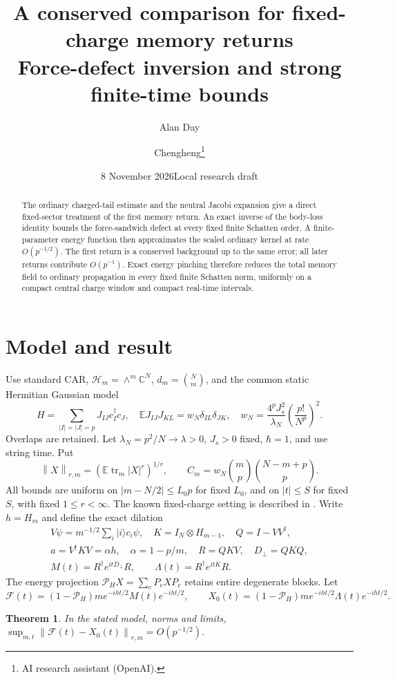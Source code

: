 \documentclass[11pt]{article}
\title{A conserved comparison for fixed-charge memory returns\\
\large Force-defect inversion and strong finite-time bounds}
\author{Alan Day \and Chengheng\thanks{AI research assistant (OpenAI).}}
\date{8 November 2026\quad Local research draft}
\newcommand{\E}{\mathbb E}
\newcommand{\tr}{\operatorname{tr}}
\newcommand{\Pin}{\mathcal P_H}
\newcommand{\norm}[1]{\left\lVert#1\right\rVert}
\newtheorem{theorem}{Theorem}
\begin{document}
\maketitle
\begin{abstract}
The ordinary charged-tail estimate and the neutral Jacobi expansion
give a direct fixed-sector treatment of the first memory return.
An exact inverse of the body-loss identity bounds the force-sandwich
defect at every fixed finite Schatten order. A finite-parameter energy
function then approximates the scaled ordinary kernel at rate
$O(p^{-1/2})$. The first return is a conserved background up to the
same error; all later returns contribute $O(p^{-1})$. Exact energy
pinching therefore reduces the total memory field to ordinary
propagation in every fixed finite Schatten norm, uniformly on a
compact central charge window and compact real-time intervals.
\end{abstract}
\section{Model and result}
Use standard CAR, $\mathcal H_m=\wedge^m\mathbb C^N$,
$d_m=\binom Nm$, and the common static Hermitian Gaussian model
\[
 H=\sum_{|I|=|J|=p}J_{IJ}c_I^\dagger c_J,\quad
 \E J_{IJ}J_{KL}=w_N\delta_{IL}\delta_{JK},\quad
 w_N=\frac{4^pJ_s^2}{\lambda_N}\left(\frac{p!}{N^p}\right)^2.
\]
Overlaps are retained. Let $\lambda_N=p^2/N\to\lambda>0$,
$J_s>0$ fixed, $\hbar=1$, and use string time. Put
\[
 \norm X_{r,m}=(\E\tr_m|X|^r)^{1/r},\qquad
 C_m=w_N\binom mp\binom{N-m+p}p.
\]
All bounds are uniform on $|m-N/2|\le L_0p$ for fixed $L_0$,
and on $|t|\le S$ for fixed $S$, with fixed $1\le r<\infty$.
The known fixed-charge setting is described in \cite{bnr}.
Write $h=H_m$ and define the exact dilation
\begin{gather*}
 V\psi=m^{-1/2}\sum_i|i\rangle c_i\psi,\quad
 K=I_N\otimes H_{m-1},\quad Q=I-VV^\dagger,\\
 a=V^\dagger KV=\alpha h,\quad\alpha=1-p/m,\quad
 R=QKV,\quad D_\perp=QKQ,\\
 M(t)=R^\dagger e^{itD_\perp}R,\qquad
 \Lambda(t)=R^\dagger e^{itK}R.
\end{gather*}
The energy projection $\Pin X=\sum_eP_eXP_e$ retains entire
degenerate blocks. Let
\[
 \mathcal F(t)=(1-\Pin)m e^{-iht/2}M(t)e^{-iht/2},\qquad
 X_0(t)=(1-\Pin)m e^{-iht/2}\Lambda(t)e^{-iht/2}.
\]
\begin{theorem}\label{main}
In the stated model, norms and limits,
$\sup_{m,t}\norm{\mathcal F(t)-X_0(t)}_{r,m}=O(p^{-1/2})$.
\end{theorem}
\end{document}
